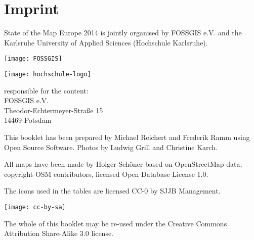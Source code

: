 \newpage
\section*{Imprint}
\label{imprint}

\begin{raggedright}
State of the Map Europe 2014 is jointly organised by FOSSGIS
e.V. and the Karlsruhe University of Applied Sciences
(Hochschule Karlsruhe).

\vspace{0.5em}
 \begin{minipage}[htbp]{0.47\textwidth}
	\texttt{[image: FOSSGIS]}
\end{minipage}
\hfill
\begin{minipage}[hbtp]{0.47\textwidth}
\texttt{[image: hochschule-logo]}
\end{minipage}

\vspace{1.6em}
\noindent responsible for the content:\\
FOSSGIS e.V.\\
Theodor-Echtermeyer-Straße 15\\
14469 Potsdam

\vspace{1em}
\noindent This booklet has been prepared by Michael Reichert and Frederik
Ramm using Open Source Software. Photos by Ludwig Grill and 
Christine Karch.

\vspace{0.5em}

\noindent All maps have been made by Holger Schöner based on Open\-Street\-Map
data, copyright OSM contributors, licensed Open Database License 1.0.

\vspace{0.5em}
\noindent The icons used in the tables are licensed CC-0 by SJJB Management.


\vspace{1em}
\noindent \begin{minipage}[htbp]{0.2\textwidth}
\noindent\texttt{[image: cc-by-sa]}
\end{minipage}
\hfill
\begin{minipage}[hbtp]{0.74\textwidth}
The whole of this booklet may be re-used under the Creative
Commons Attribution Share-Alike 3.0 license.
\end{minipage}
\end{raggedright}

